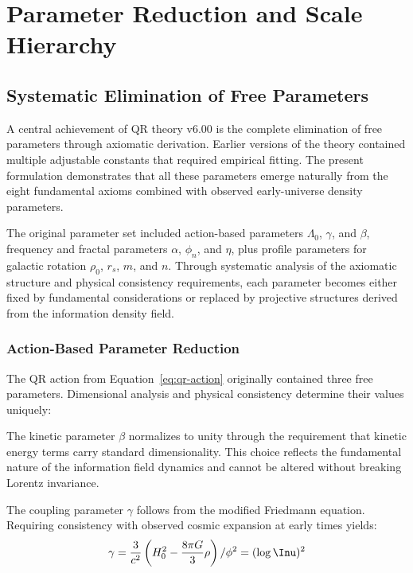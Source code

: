 \section{Parameter Reduction and Scale Hierarchy}
\label{sec:parameter-reduction}

\subsection{Systematic Elimination of Free Parameters}
\label{subsec:systematic-elimination}

A central achievement of QR theory v6.00 is the complete elimination of free parameters through axiomatic derivation. Earlier versions of the theory contained multiple adjustable constants that required empirical fitting. The present formulation demonstrates that all these parameters emerge naturally from the eight fundamental axioms combined with observed early-universe density parameters.

The original parameter set included action-based parameters $\Lambda_0$, $\gamma$, and $\beta$, frequency and fractal parameters $\alpha$, $\phi_n$, and $\eta$, plus profile parameters for galactic rotation $\rho_0$, $r_s$, $m$, and $n$. Through systematic analysis of the axiomatic structure and physical consistency requirements, each parameter becomes either fixed by fundamental considerations or replaced by projective structures derived from the information density field.

\subsubsection{Action-Based Parameter Reduction}
\label{subsubsec:action-parameters}

The QR action from Equation~\ref{eq:qr-action} originally contained three free parameters. Dimensional analysis and physical consistency determine their values uniquely:

The kinetic parameter $\beta$ normalizes to unity through the requirement that kinetic energy terms carry standard dimensionality. This choice reflects the fundamental nature of the information field dynamics and cannot be altered without breaking Lorentz invariance.

The coupling parameter $\gamma$ follows from the modified Friedmann equation. Requiring consistency with observed cosmic expansion at early times yields:
\begin{equation}
\gamma = \frac{3}{c^2} \left( H_0^2 - \frac{8\pi G}{3} \rho \right) / \phi^2 = (\log \Inu)^2
\label{eq:gamma-derivation}
\end{equation}

